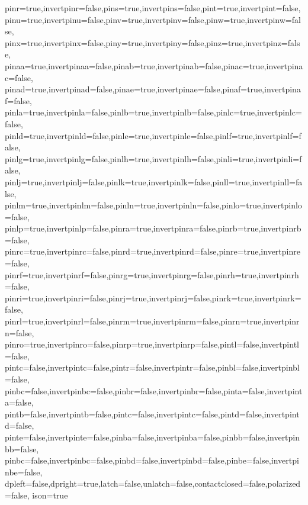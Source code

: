 {  pinr=true,invertpinr=false,pins=true,invertpins=false,pint=true,invertpint=false,
  pinu=true,invertpinu=false,pinv=true,invertpinv=false,pinw=true,invertpinw=false,
  pinx=true,invertpinx=false,piny=true,invertpiny=false,pinz=true,invertpinz=false,
  pinaa=true,invertpinaa=false,pinab=true,invertpinab=false,pinac=true,invertpinac=false,
  pinad=true,invertpinad=false,pinae=true,invertpinae=false,pinaf=true,invertpinaf=false,
  pinla=true,invertpinla=false,pinlb=true,invertpinlb=false,pinlc=true,invertpinlc=false,
  pinld=true,invertpinld=false,pinle=true,invertpinle=false,pinlf=true,invertpinlf=false,
  pinlg=true,invertpinlg=false,pinlh=true,invertpinlh=false,pinli=true,invertpinli=false,
  pinlj=true,invertpinlj=false,pinlk=true,invertpinlk=false,pinll=true,invertpinll=false,
  pinlm=true,invertpinlm=false,pinln=true,invertpinln=false,pinlo=true,invertpinlo=false,
  pinlp=true,invertpinlp=false,pinra=true,invertpinra=false,pinrb=true,invertpinrb=false,
  pinrc=true,invertpinrc=false,pinrd=true,invertpinrd=false,pinre=true,invertpinre=false,
  pinrf=true,invertpinrf=false,pinrg=true,invertpinrg=false,pinrh=true,invertpinrh=false,
  pinri=true,invertpinri=false,pinrj=true,invertpinrj=false,pinrk=true,invertpinrk=false,
  pinrl=true,invertpinrl=false,pinrm=true,invertpinrm=false,pinrn=true,invertpinrn=false,
  pinro=true,invertpinro=false,pinrp=true,invertpinrp=false,pintl=false,invertpintl=false,
  pintc=false,invertpintc=false,pintr=false,invertpintr=false,pinbl=false,invertpinbl=false,
  pinbc=false,invertpinbc=false,pinbr=false,invertpinbr=false,pinta=false,invertpinta=false,
  pintb=false,invertpintb=false,pintc=false,invertpintc=false,pintd=false,invertpintd=false,
  pinte=false,invertpinte=false,pinba=false,invertpinba=false,pinbb=false,invertpinbb=false,
  pinbc=false,invertpinbc=false,pinbd=false,invertpinbd=false,pinbe=false,invertpinbe=false,
  dpleft=false,dpright=true,latch=false,unlatch=false,contactclosed=false,polarized=false,
  ison=true
}%


